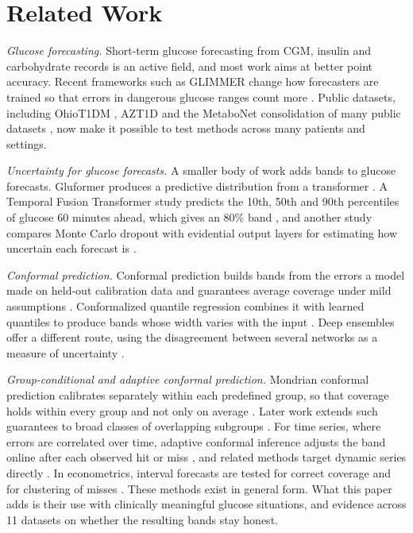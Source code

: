 \section{Related Work}
\label{sec:related}

\textit{Glucose forecasting.} Short-term glucose forecasting from CGM, insulin and carbohydrate records is an active field, and most work aims at better point accuracy. Recent frameworks such as GLIMMER change how forecasters are trained so that errors in dangerous glucose ranges count more \parencite{glimmer2026}. Public datasets, including OhioT1DM \parencite{marling2020ohio}, AZT1D \parencite{azt1d2025} and the MetaboNet consolidation of many public datasets \parencite{metabonet2026}, now make it possible to test methods across many patients and settings.

\textit{Uncertainty for glucose forecasts.} A smaller body of work adds bands to glucose forecasts. Gluformer produces a predictive distribution from a transformer \parencite{sergazinov2023gluformer}. A Temporal Fusion Transformer study predicts the 10th, 50th and 90th percentiles of glucose 60 minutes ahead, which gives an 80\% band \parencite{rodriguezalmeida2025tft}, and another study compares Monte Carlo dropout with evidential output layers for estimating how uncertain each forecast is \parencite{tan2026uncertainty}.

\textit{Conformal prediction.} Conformal prediction builds bands from the errors a model made on held-out calibration data and guarantees average coverage under mild assumptions \parencite{vovk2005alrw}. Conformalized quantile regression combines it with learned quantiles to produce bands whose width varies with the input \parencite{romano2019cqr}. Deep ensembles offer a different route, using the disagreement between several networks as a measure of uncertainty \parencite{lakshminarayanan2017ensembles}.

\textit{Group-conditional and adaptive conformal prediction.} Mondrian conformal prediction calibrates separately within each predefined group, so that coverage holds within every group and not only on average \parencite{vovk2005alrw, vovk2012conditional}. Later work extends such guarantees to broad classes of overlapping subgroups \parencite{gibbs2023conditional}. For time series, where errors are correlated over time, adaptive conformal inference adjusts the band online after each observed hit or miss \parencite{gibbs2021aci}, and related methods target dynamic series directly \parencite{xu2021conformal}. In econometrics, interval forecasts are tested for correct coverage and for clustering of misses \parencite{christoffersen1998evaluating}. These methods exist in general form. What this paper adds is their use with clinically meaningful glucose situations, and evidence across 11 datasets on whether the resulting bands stay honest.

